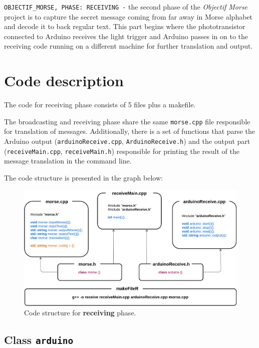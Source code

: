 \documentclass[12pt]{report}
\begin{document}
\verb|OBJECTIF_MORSE, PHASE: RECEIVING -| the second phase of the \textit{Objectif Morse} project is to capture the secret message coming from far away in Morse alphabet and decode it to back regular text. This part begins where the phototransistor connected to Arduino receives the light trigger and Arduino passes in on to the receiving code running on a different machine for further translation and output.

\newpage

\section{Code description}

The code for receiving phase consists of 5 files plus a makefile. 

The broadcasting and receiving phase share the same \verb|morse.cpp| file responsible for translation of messages. Additionally, there is a set of functions that parse the Arduino output (\verb|arduinoReceive.cpp|, \verb|ArduinoReceive.h|) and the output part (\verb|receiveMain.cpp|, \verb|receiveMain.h|) responsible for printing the result of the message translation in the command line.

The code structure is presented in the graph below:

\begin{figure}[H]
\centering\includegraphics[width=14.5cm]{rCodeStructure}
\caption{Code structure for \textbf{receiving} phase.}	
\label{fig:re_code}
\end{figure}

\newpage

\subsection{Class \texttt{arduino}}
\end{document}
